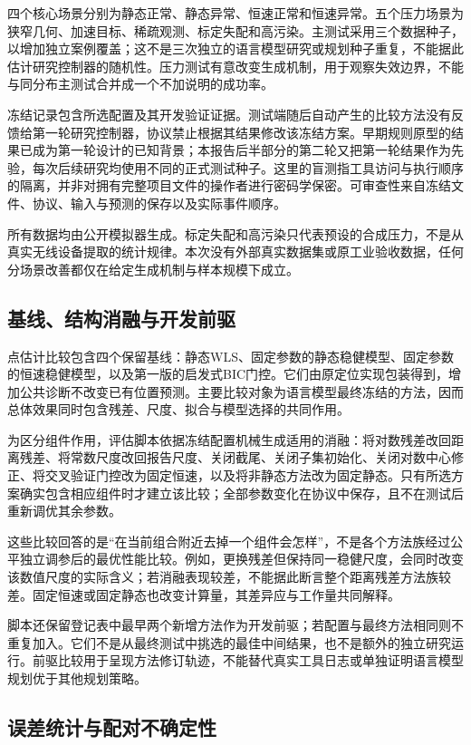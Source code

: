 四个核心场景分别为静态正常、静态异常、恒速正常和恒速异常。五个压力场景为狭窄几何、加速目标、稀疏观测、标定失配和高污染。主测试采用三个数据种子，以增加独立案例覆盖；这不是三次独立的语言模型研究或规划种子重复，不能据此估计研究控制器的随机性。压力测试有意改变生成机制，用于观察失效边界，不能与同分布主测试合并成一个不加说明的成功率。

冻结记录包含所选配置及其开发验证证据。测试端随后自动产生的比较方法没有反馈给第一轮研究控制器，协议禁止根据其结果修改该冻结方案。早期规则原型的结果已成为第一轮设计的已知背景；本报告后半部分的第二轮又把第一轮结果作为先验，每次后续研究均使用不同的正式测试种子。这里的盲测指工具访问与执行顺序的隔离，并非对拥有完整项目文件的操作者进行密码学保密。可审查性来自冻结文件、协议、输入与预测的保存以及实际事件顺序。

所有数据均由公开模拟器生成。标定失配和高污染只代表预设的合成压力，不是从真实无线设备提取的统计规律。本次没有外部真实数据集或原工业验收数据，任何分场景改善都仅在给定生成机制与样本规模下成立。

\subsection{基线、结构消融与开发前驱}

点估计比较包含四个保留基线：静态WLS、固定参数的静态稳健模型、固定参数的恒速稳健模型，以及第一版的启发式BIC门控。它们由原定位实现包装得到，增加公共诊断不改变已有位置预测。主要比较对象为语言模型最终冻结的方法，因而总体效果同时包含残差、尺度、拟合与模型选择的共同作用。

为区分组件作用，评估脚本依据冻结配置机械生成适用的消融：将对数残差改回距离残差、将常数尺度改回报告尺度、关闭截尾、关闭子集初始化、关闭对数中心修正、将交叉验证门控改为固定恒速，以及将非静态方法改为固定静态。只有所选方案确实包含相应组件时才建立该比较；全部参数变化在协议中保存，且不在测试后重新调优其余参数。

这些比较回答的是“在当前组合附近去掉一个组件会怎样”，不是各个方法族经过公平独立调参后的最优性能比较。例如，更换残差但保持同一稳健尺度，会同时改变该数值尺度的实际含义；若消融表现较差，不能据此断言整个距离残差方法族较差。固定恒速或固定静态也改变计算量，其差异应与工作量共同解释。

脚本还保留登记表中最早两个新增方法作为开发前驱；若配置与最终方法相同则不重复加入。它们不是从最终测试中挑选的最佳中间结果，也不是额外的独立研究运行。前驱比较用于呈现方法修订轨迹，不能替代真实工具日志或单独证明语言模型规划优于其他规划策略。

\subsection{误差统计与配对不确定性}

